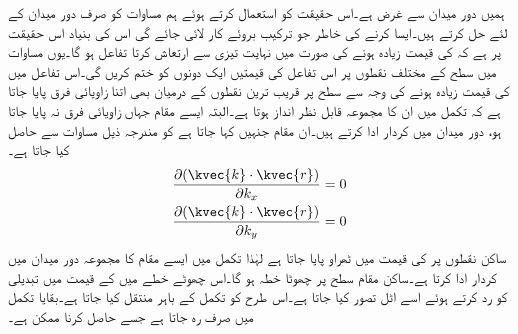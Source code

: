 ہمیں دور میدان سے غرض ہے۔اس حقیقت کو استعمال کرتے ہوئے ہم  مساوات  کو صرف دور میدان کے لئے حل کرتے ہیں۔ایسا کرنے کی خاطر جو ترکیب بروئے کار لائی جائے گی اس کی بنیاد اس حقیقت پر ہے کہ  کی قیمت زیادہ ہونے کی صورت میں   نہایت تیزی سے ارتعاش کرتا تفاعل ہو گا۔یوں مساوات  میں  سطح کے مختلف نقطوں پر اس تفاعل کی قیمتیں ایک دونوں کو ختم کریں گی۔اس تفاعل میں  کی قیمت زیادہ ہونے کی وجہ سے   سطح پر قریب ترین  نقطوں کے درمیان بھی اتنا زاویائی فرق  پایا جاتا ہے کہ تکمل میں ان کا مجموعہ قابل نظر انداز ہوتا ہے۔البتہ ایسے مقام جہاں زاویائی فرق نہ پایا جاتا ہو،  دور میدان میں کردار ادا کرتے ہیں۔ان مقام جنہیں  کہا جاتا ہے کو مندرجہ ذیل مساوات سے حاصل کیا جاتا ہے۔
\begin{gather}
  \begin{aligned}\label{مساوات_اینٹینا_ساکن_نقطے}
\frac{\partial (\kvec{k}\cdot \kvec{r})}{\partial k_x}&=0\\
\frac{\partial (\kvec{k}\cdot \kvec{r})}{\partial k_y}&=0
\end{aligned}
\end{gather}
ساکن نقطوں پر  کی قیمت میں ٹھراو پایا جاتا ہے لہٰذا تکمل میں ایسے مقام کا مجموعہ دور میدان میں کردار ادا کرتا ہے۔ساکن مقام  سطح پر چھوٹا خطہ ہو گا۔اس چھوٹے خطے  میں  کے قیمت میں تبدیلی کو رد کرتے ہوئے اسے اٹل تصور کیا جاتا ہے۔اس طرح   کو تکمل کے باہر منتقل کیا جاتا ہے۔بقایا تکمل میں صرف  رہ جاتا ہے جسے حاصل کرنا ممکن ہے۔

